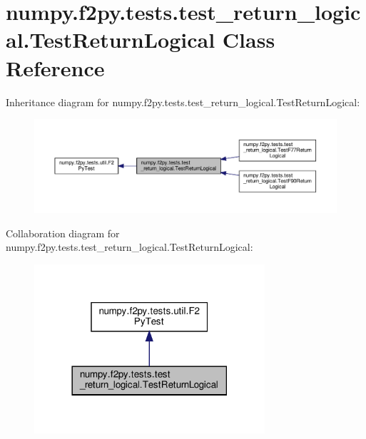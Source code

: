 \hypertarget{classnumpy_1_1f2py_1_1tests_1_1test__return__logical_1_1TestReturnLogical}{}\section{numpy.\+f2py.\+tests.\+test\+\_\+return\+\_\+logical.\+Test\+Return\+Logical Class Reference}
\label{classnumpy_1_1f2py_1_1tests_1_1test__return__logical_1_1TestReturnLogical}


Inheritance diagram for numpy.\+f2py.\+tests.\+test\+\_\+return\+\_\+logical.\+Test\+Return\+Logical\+:
\nopagebreak
\begin{figure}[H]
\begin{center}
\leavevmode
\includegraphics[width=350pt]{classnumpy_1_1f2py_1_1tests_1_1test__return__logical_1_1TestReturnLogical__inherit__graph}
\end{center}
\end{figure}


Collaboration diagram for numpy.\+f2py.\+tests.\+test\+\_\+return\+\_\+logical.\+Test\+Return\+Logical\+:
\nopagebreak
\begin{figure}[H]
\begin{center}
\leavevmode
\includegraphics[width=242pt]{classnumpy_1_1f2py_1_1tests_1_1test__return__logical_1_1TestReturnLogical__coll__graph}
\end{center}
\end{figure}
